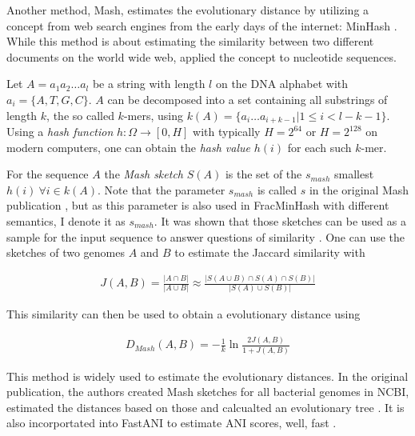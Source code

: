 Another method, Mash, estimates the evolutionary distance by utilizing a concept
from web search engines from the early days of the internet: MinHash
\cite{broderResemblanceContainmentDocuments1998a,ondovMashFastGenome2016}. While
this method is about estimating the similarity between two different documents
on the world wide web,  applied the concept
to nucleotide sequences.

Let $A = a_1 a_2 \dots a_l$ be a string with length $l$ on the DNA alphabet with
$a_i = \{A, T, G, C\}$. $A$ can be decomposed into a set containing all
substrings of length $k$, the so called $k$-mers, using $k(A) = \{a_i \dots
a_{i+k-1} | 1 \leq i < l-k-1\}$. Using a \textit{hash function} $h: \Omega
\rightarrow [0, H]$ with typically $H=2^{64}$ or $H=2^{128}$ on modern
computers, one can obtain the \textit{hash value} $h(i)$ for each such $k$-mer.

For the sequence $A$ the \textit{Mash sketch} $S(A)$ is the set of the
$s_{mash}$ smallest $h(i) ~ \forall i \in k(A)$. Note that the parameter
$s_{mash}$ is called $s$ in the original Mash publication
\cite{ondovMashFastGenome2016}, but as this parameter is also used in
FracMinHash with different semantics, I denote it as $s_{mash}$. It was shown
that those sketches can be used as a sample for the input sequence to answer
questions of similarity \cite{ondovMashFastGenome2016}. One can use the sketches
of two genomes $A$ and $B$ to estimate the Jaccard similarity with 

\begin{align}
  J(A, B) = \frac{|A \cap B|}{|A \cup B|} \approx \frac{|S(A \cup B) \cap S(A) \cap S(B)|}{|S(A) \cup S(B)|}
\end{align}

This similarity can then be used to obtain a evolutionary distance using

\begin{align}
  D_{Mash}(A,B) = -\frac{1}{k}\ln{\frac{2J(A,B)}{1+J(A,B)}}
\end{align}

This method is widely used to estimate the evolutionary distances. In the
original publication, the authors created Mash sketches for all bacterial
 genomes in NCBI, estimated the
distances based on those and calcualted an evolutionary tree
\cite{ondovMashFastGenome2016}. It is also incorportated into FastANI to
estimate ANI scores, well, fast \cite{jainHighThroughputANI2018}.

